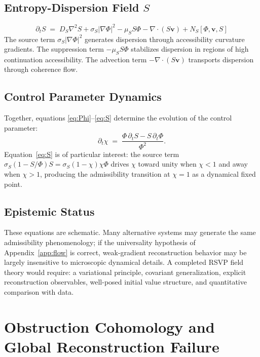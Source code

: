 \documentclass[11pt, a4paper]{article}
\theoremstyle{plain}
\theoremstyle{definition}
\theoremstyle{remark}
\begin{document}
\subsection{Entropy-Dispersion Field $S$}

\begin{equation}
  \label{eq:S}
  \partial_t S \;=\; D_S\nabla^2 S + \sigma_S |\nabla\Phi|^2
    - \mu_S S\Phi - \nabla\cdot(S\mathbf{v}) + N_S[\Phi,\mathbf{v},S]
\end{equation}
The source term $\sigma_S |\nabla\Phi|^2$ generates dispersion through accessibility
curvature gradients. The suppression term $-\mu_S S\Phi$ stabilizes dispersion in
regions of high continuation accessibility. The advection term $-\nabla\cdot(S\mathbf{v})$
transports dispersion through coherence flow.

\subsection{Control Parameter Dynamics}

Together, equations \eqref{eq:Phi}--\eqref{eq:S} determine the evolution of the
control parameter:
\[
  \partial_t\chi \;=\; \frac{\Phi\,\partial_t S - S\,\partial_t\Phi}{\Phi^2}.
\]
Equation~\eqref{eq:S} is of particular interest: the source term $\sigma_S(1 -
S/\Phi)S = \sigma_S(1 - \chi)\chi\Phi$ drives $\chi$ toward unity when $\chi < 1$
and away when $\chi > 1$, producing the admissibility transition at $\chi = 1$ as a
dynamical fixed point.

\subsection{Epistemic Status}

These equations are schematic. Many alternative systems may generate the same
admissibility phenomenology; if the universality hypothesis of Appendix~\ref{app:flow}
is correct, weak-gradient reconstruction behavior may be largely insensitive to
microscopic dynamical details. A completed RSVP field theory would require: a
variational principle, covariant generalization, explicit reconstruction observables,
well-posed initial value structure, and quantitative comparison with data.

\section{Obstruction Cohomology and Global Reconstruction Failure}
\label{app:cohomology}
\end{document}
